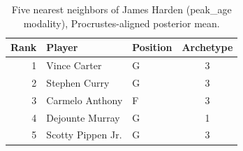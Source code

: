 \begin{table}[htbp]
  \centering\small
  \begin{tabular}{rllc}
    \toprule
    Rank & Player & Position & Archetype \\
    \midrule
    1 & Vince Carter & G & 3 \\
    2 & Stephen Curry & G & 3 \\
    3 & Carmelo Anthony & F & 3 \\
    4 & Dejounte Murray & G & 1 \\
    5 & Scotty Pippen Jr. & G & 3 \\
    \bottomrule
  \end{tabular}
  \caption{Five nearest neighbors of James Harden (peak_age modality), Procrustes-aligned posterior mean.}
  \label{tab:James_Harden_neighbors_peak_age}
\end{table}

